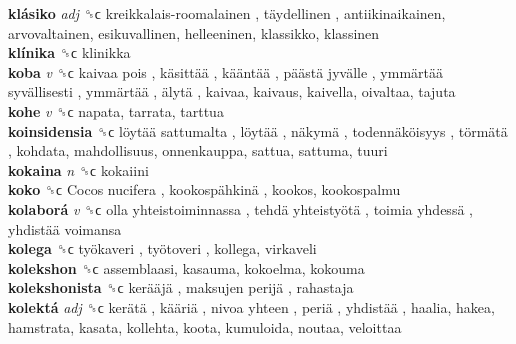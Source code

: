 \textbf{klásiko} \emph{adj}  ␝ϲ   kreikkalais-roomalainen ,  täydellinen , antiikinaikainen, arvovaltainen, esikuvallinen, helleeninen, klassikko, klassinen  \\
\textbf{klínika} ␝ϲ  klinikka  \\
\textbf{koba} \emph{v}  ␝ϲ   kaivaa pois ,  käsittää ,  kääntää ,  päästä jyvälle ,  ymmärtää syvällisesti ,  ymmärtää ,  älytä , kaivaa, kaivaus, kaivella, oivaltaa, tajuta  \\
\textbf{kohe} \emph{v}  ␝ϲ  napata, tarrata, tarttua  \\
\textbf{koinsidensia} ␝ϲ   löytää sattumalta ,  löytää ,  näkymä ,  todennäköisyys ,  törmätä , kohdata, mahdollisuus, onnenkauppa, sattua, sattuma, tuuri  \\
\textbf{kokaina} \emph{n}  ␝ϲ  kokaiini  \\
\textbf{koko} ␝ϲ   Cocos nucifera ,  kookospähkinä , kookos, kookospalmu  \\
\textbf{kolaborá} \emph{v}  ␝ϲ   olla yhteistoiminnassa ,  tehdä yhteistyötä ,  toimia yhdessä ,  yhdistää voimansa   \\
\textbf{kolega} ␝ϲ   työkaveri ,  työtoveri , kollega, virkaveli  \\
\textbf{kolekshon} ␝ϲ  assemblaasi, kasauma, kokoelma, kokouma  \\
\textbf{kolekshonista} ␝ϲ   kerääjä ,  maksujen perijä , rahastaja  \\
\textbf{kolektá} \emph{adj}  ␝ϲ   kerätä ,  kääriä ,  nivoa yhteen ,  periä ,  yhdistää , haalia, hakea, hamstrata, kasata, kollehta, koota, kumuloida, noutaa, veloittaa  \\

